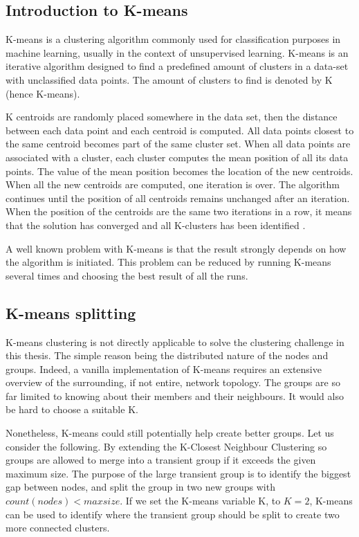 \subsection{Introduction to K-means}
K-means is a clustering algorithm commonly used for classification purposes in machine learning, usually in the context of unsupervised learning. K-means
is an iterative algorithm designed to find a predefined amount of clusters in a data-set with unclassified data points. The amount of clusters to find is denoted by
K (hence K-means). 

K centroids are randomly placed somewhere in the data set, then the distance between each data point and each centroid is computed. All data points
closest to the same centroid becomes part of the same cluster set. When all data points are associated with a cluster, each cluster computes the mean position of all its data points.
The value of the mean position becomes the location of the new centroids. When all the new centroids are computed, one iteration is over. The algorithm continues until the position 
of all centroids remains unchanged after an iteration. When the position of the centroids are the same two iterations in a row, it means that the solution has converged and all K-clusters has been identified \cite{mackaymeans}.

A well known problem with K-means is that the result strongly depends on how the algorithm is initiated. This problem can be reduced by running K-means several times
and choosing the best result of all the runs. 

\subsection{K-means splitting}
K-means clustering is not directly applicable to solve the clustering challenge in this thesis. The simple reason being the distributed nature of
the nodes and groups. Indeed, a vanilla implementation of K-means requires an extensive overview of the surrounding, if not entire, network topology.
The groups are so far limited to knowing about their members and their neighbours. It would also be hard to choose a suitable K. 

Nonetheless, K-means could still potentially help create better groups. Let us consider the following.
By extending the K-Closest Neighbour Clustering so groups are allowed to merge into a transient group if it exceeds the given maximum size.
The purpose of the large transient group is to identify the biggest gap between nodes, and split the group in two new groups with
$count(nodes) < maxsize$. If we set the K-means variable K, to $K=2$, K-means can be used to identify where the transient group should be split to create two more connected clusters. 

